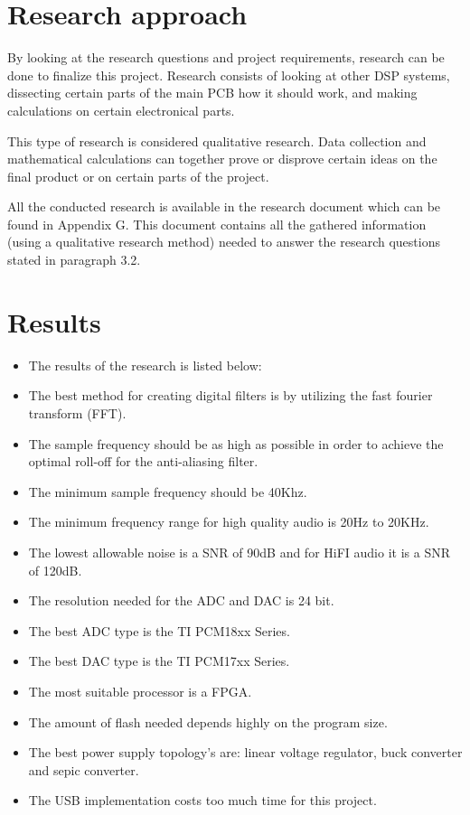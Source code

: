 \section{Research approach}

By looking at the research questions and project requirements, research can be done to finalize this project. Research consists of looking at other DSP systems, dissecting certain parts of the main PCB how it should work, and making calculations on certain electronical parts.  
\par
\noindent This type of research is considered qualitative research. Data collection and mathematical calculations can together prove or disprove certain ideas on the final product or on certain parts of the project.
\par
\noindent
All the conducted research is available in the research document which can be found in Appendix G. This document contains all the gathered information (using a qualitative research method) needed to answer the research questions stated in paragraph 3.2. 

\section{Results}
\begin{itemize} %
	\setlength\itemsep{-0.3em} %
		\item The results of the research is listed below:
		\item The best method for creating digital filters is by utilizing the fast fourier transform (FFT).
		\item The sample frequency should be as high as possible in order to achieve the optimal roll-off for the anti-aliasing filter. 
		\item The minimum sample frequency should be 40Khz.
		\item The minimum frequency range for high quality audio is 20Hz to 20KHz.
		\item The lowest allowable noise is a SNR of 90dB and for HiFI audio it is a SNR of 120dB.
		\item The resolution needed for the ADC and DAC is 24 bit.
		\item The best ADC type is the TI PCM18xx Series.
		\item The best DAC type is the TI PCM17xx Series.
		\item The most suitable processor is a FPGA.
		\item The amount of flash needed depends highly on the program size.
		\item The best power supply topology's are: linear voltage regulator, buck converter and sepic converter.
		\item The USB implementation costs too much time for this project.
\end{itemize} 